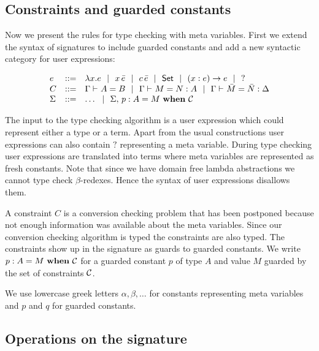 \subsection{Constraints and guarded constants}

Now we present the rules for type checking with meta variables. First we extend
the syntax of signatures to include guarded constants and add a new syntactic
category for user expressions:

\[\begin{array}{lcll}
    e & ::= & \lambda x.{}e ~~|~~ x\,\bar e ~~|~~ c\,\bar e ~~|~~ \mathsf{Set} ~~|~~ (x:e)\to{}e ~~|~~ ? \\
    C & ::= & {\Gamma} \vdash_{}A=B ~~|~~ {\Gamma} \vdash_{}M=N:A ~~|~~
	      {\Gamma} \vdash_{}\bar M=\bar N:\Delta \\
    \Sigma & ::= & \ldots ~~|~~
		{\Sigma},\,{} {p} : {A} = {M} ~\mathbf{when}~ {\mathcal{C}} \\
\end{array}\]

The input to the type checking algorithm is a user expression which could
represent either a type or a term. Apart from the usual constructions user
expressions can also contain $?$ representing a meta variable. During type
checking user expressions are translated into {\Core} terms where meta
variables are represented as fresh constants. Note that since we have domain
free lambda abstractions we cannot type check $\beta$-redexes. Hence the syntax
of user expressions disallows them.

A constraint $C$ is a conversion checking problem that has been postponed
because not enough information was available about the meta variables. Since
our conversion checking algorithm is typed the constraints are also typed. The
constraints show up in the signature as guards to guarded constants. We write
${p} : {A} = {M} ~\mathbf{when}~ {\mathcal{C}}$ for a guarded constant $p$ of type $A$ and value $M$
guarded by the set of constraints $\mathcal{C}$.

We use lowercase greek letters $\alpha, \beta, \ldots$ for constants
representing meta variables and $p$ and $q$ for guarded constants.

\subsection{Operations on the signature}

